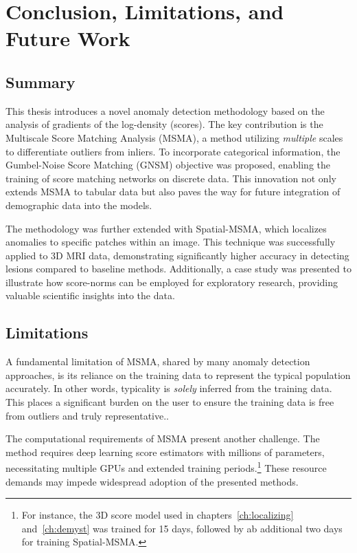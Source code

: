 \chapter{Conclusion, Limitations, and Future Work}
\label{ch:conclusion}

\section{Summary}
This thesis introduces a novel anomaly detection methodology based on the analysis of gradients of the log-density (scores). The key contribution is the Multiscale Score Matching Analysis (MSMA), a method utilizing \textit{multiple} scales to differentiate outliers from inliers. To incorporate categorical information, the Gumbel-Noise Score Matching (GNSM) objective was proposed, enabling the training of score matching networks on discrete data. This innovation not only extends MSMA to tabular data but also paves the way for future integration of demographic data into the models.

The methodology was further extended with Spatial-MSMA, which localizes anomalies to specific patches within an image. This technique was successfully applied to 3D MRI data, demonstrating significantly higher accuracy in detecting lesions compared to baseline methods. Additionally, a case study was presented to illustrate how score-norms can be employed for exploratory research, providing valuable scientific insights into the data.


\section{Limitations}
A fundamental limitation of MSMA, shared by many anomaly detection approaches, is its reliance on the training data to represent the typical population accurately. In other words, typicality is \textit{solely} inferred from the training data. This places a significant burden on the user to ensure the training data is free from outliers and truly representative..

The computational requirements of MSMA present another challenge. The method requires deep learning score estimators with millions of parameters, necessitating multiple GPUs and extended training periods.\footnote{For instance, the 3D score model used in chapters~\ref{ch:localizing} and~\ref{ch:demyst} was trained for 15 days, followed by ab additional two days for training Spatial-MSMA.} These resource demands may impede widespread adoption of the presented methods.

